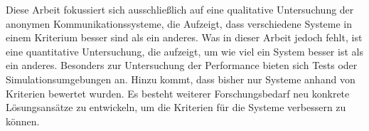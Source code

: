 Diese Arbeit fokussiert sich ausschließlich auf eine qualitative Untersuchung der anonymen Kommunikationssysteme, die Aufzeigt, dass verschiedene Systeme in einem Kriterium besser sind als ein anderes. Was in dieser Arbeit jedoch fehlt, ist eine quantitative Untersuchung, die aufzeigt, um wie viel ein System besser ist als ein anderes. Besonders zur Untersuchung der Performance bieten sich Tests oder Simulationsumgebungen an.
Hinzu kommt, dass bisher nur Systeme anhand von Kriterien bewertet wurden. Es besteht weiterer Forschungsbedarf neu konkrete Lösungsansätze zu entwickeln, um die Kriterien für die Systeme verbessern zu können.